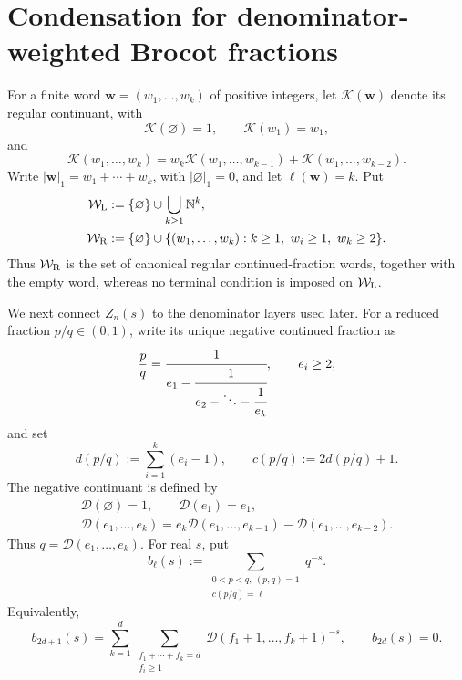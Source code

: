 \section{Condensation for denominator-weighted Brocot fractions}
\label{sec:brocot-condensation}

For a finite word \(\mathbf w=(w_1,\ldots,w_k)\) of positive integers,
let \(\mathcal K(\mathbf w)\) denote its regular continuant, with
\[
 \mathcal K(\varnothing)=1,\qquad
 \mathcal K(w_1)=w_1,
\]
and
\[
 \mathcal K(w_1,\ldots,w_k)
 =w_k\mathcal K(w_1,\ldots,w_{k-1})
  +\mathcal K(w_1,\ldots,w_{k-2}).
\]
Write \(|\mathbf w|_1=w_1+\cdots+w_k\), with
\(|\varnothing|_1=0\), and let \(\ell(\mathbf w)=k\).  Put
\[
 \begin{aligned}
  \mathcal W_{\rm L}&:=\{\varnothing\}\cup
    \bigcup_{k\ge1}\mathbb N^k,\\
  \mathcal W_{\rm R}&:=\{\varnothing\}\cup
    \{(w_1,\ldots,w_k):k\ge1,\ w_i\ge1,\ w_k\ge2\}.
 \end{aligned}
\]
Thus \(\mathcal W_{\rm R}\) is the set of canonical regular
continued-fraction words, together with the empty word, whereas no terminal
condition is imposed on \(\mathcal W_{\rm L}\).

We next connect \(Z_n(s)\) to the denominator layers used later.  For a
reduced fraction \(p/q\in(0,1)\), write its unique negative continued
fraction as
\[
 \frac pq=
 \cfrac1{e_1-\cfrac1{e_2-\ddots-\cfrac1{e_k}}},
 \qquad e_i\ge2,
\]
and set
\[
 d(p/q):=\sum_{i=1}^k(e_i-1),
 \qquad c(p/q):=2d(p/q)+1.
\]
The negative continuant is defined by
\[
 \begin{gathered}
  \mathcal D(\varnothing)=1,\qquad \mathcal D(e_1)=e_1,\\
  \mathcal D(e_1,\ldots,e_k)
  =e_k\mathcal D(e_1,\ldots,e_{k-1})
   -\mathcal D(e_1,\ldots,e_{k-2}).
 \end{gathered}
\]
Thus \(q=\mathcal D(e_1,\ldots,e_k)\).  For real \(s\), put
\begin{equation}
 b_\ell(s):=
 \sum_{\substack{0<p<q,\ (p,q)=1\\c(p/q)=\ell}}q^{-s}.
 \label{eq:weighted-letter-definition}
\end{equation}
Equivalently,
\begin{equation}
 b_{2d+1}(s)
 =\sum_{k=1}^d
   \sum_{\substack{f_1+\cdots+f_k=d\\f_i\ge1}}
   \mathcal D(f_1+1,\ldots,f_k+1)^{-s},
 \qquad b_{2d}(s)=0.
 \label{eq:weighted-letter-coefficients}
\end{equation}

